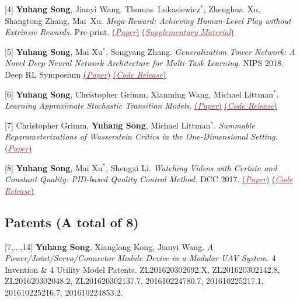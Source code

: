 	\cvitem{} {[4] {\textbf{Yuhang Song}, Jianyi Wang, Thomas~Lukasiewicz$^*$, Zhenghua~Xu, Shangtong Zhang, Mai~Xu.
		\emph{Mega-Reward: Achieving Human-Level Play without Extrinsic Rewards.} Pre-print.}
			\href{https://arxiv.org/abs/1905.04640}{{(\textcolor{brown}{\underline{\textit{Paper}}})}}
			\href{https://www.dropbox.com/s/pk79a6wkmkc4tox/main.pdf?dl=0}{{(\textcolor{brown}{\underline{\textit{Supplementary Material}}})}}
		}

    \cvitem{} {[5] {\textbf{Yuhang Song}, Mai Xu$^*$, Songyang Zhang.
        \emph{Generalization Tower Network: A Novel Deep Neural Network Architecture for Multi-Task Learning.} NIPS 2018. Deep RL Symposium}
            \href{https://arxiv.org/abs/1710.10036}{{(\textcolor{brown}{\underline{\textit{Paper}}})}}
            \href{https://github.com/YuhangSong/GTN}{{(\textcolor{brown}{\underline{\textit{Code Release}}})}}
        }

    \cvitem{} {[6] {\textbf{Yuhang Song}, Christopher Grimm, Xianming Wang, Michael Littman$^*$.
        \emph{Learning Approximate Stochastic Transition Models.}}
            \href{https://arxiv.org/abs/1710.09718}{{(\textcolor{brown}{\underline{\textit{Paper}}})}}
            \href{https://github.com/YuhangSong/SGAN}{{(\textcolor{brown}{\underline{\textit{Code Release}}})}}
        }

    \cvitem{} {[7] {Christopher Grimm, \textbf{Yuhang Song}, Michael Littman$^*$.
        \emph{Summable Reparameterizations of Wasserstein Critics in the One-Dimensional Setting.}}
            \href{https://arxiv.org/abs/1709.06533}{{(\textcolor{brown}{\underline{\textit{Paper}}})}}}

    \cvitem{} {[8] {\textbf{Yuhang Song}, Mai Xu$^*$, Shengxi Li.
        \emph{Watching Videos with Certain and Constant Quality: PID-based Quality Control Method.} DCC 2017.}
            \href{https://arxiv.org/abs/1710.09980}{{(\textcolor{brown}{\underline{\textit{Paper}}})}}
            \href{https://github.com/YuhangSong/PQC}{{(\textcolor{brown}{\underline{\textit{Code Release}}})}}
        }

\subsection{Patents (A total of 8)}
    \cvitem{} {[7,...,14] {\textbf{Yuhang Song}, Xianglong Kong, Jianyi Wang. \emph{A Power/Joint/Servo/Connector Module Device in a Modular UAV System.}  4 Invention \& 4 Utility Model Patents. ZL201620302692.X, ZL201620302142.8, ZL201620302048.2, ZL201620302137.7, 201610224780.7, 201610225217.1, 201610225216.7, 201610224853.2.}}


